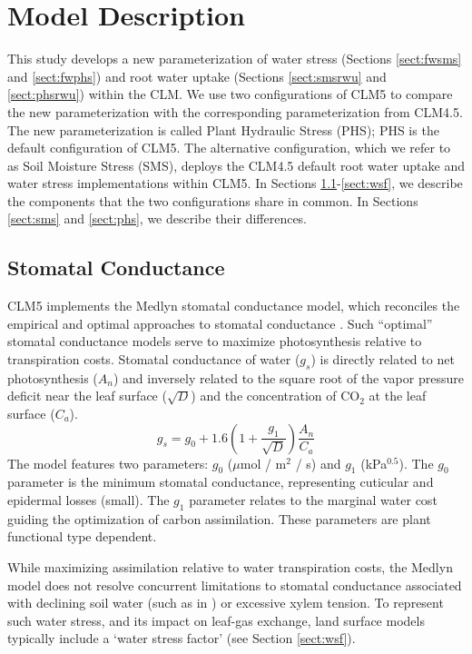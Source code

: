\documentclass[draft,linenumbers]{agujournal}
\begin{document}
\section{Model Description}
This study develops a new parameterization of water stress (Sections \ref{sect:fwsms} and \ref{sect:fwphs}) and root water uptake (Sections \ref{sect:smsrwu} and \ref{sect:phsrwu}) within the CLM. We use two configurations of CLM5 to compare the new parameterization with the corresponding parameterization from CLM4.5. The new parameterization is called Plant Hydraulic Stress (PHS); PHS is the default configuration of CLM5. The alternative configuration, which we refer to as Soil Moisture Stress (SMS), deploys the CLM4.5 default root water uptake and water stress implementations within CLM5.  In Sections \ref{sect:gs}-\ref{sect:wsf}, we describe the components that the two configurations share in common. In Sections \ref{sect:sms} and \ref{sect:phs}, we describe their differences.
    
    
\subsection{Stomatal Conductance}
\label{sect:gs}
    CLM5 implements the Medlyn stomatal conductance model, which reconciles the empirical and optimal approaches to 
    stomatal conductance \citep{medlyn2011}.
    Such ``optimal'' stomatal conductance models serve to maximize photosynthesis relative to transpiration costs. 
    Stomatal conductance of water ($g_s$) is directly related to net photosynthesis ($A_n$) 
    and inversely related to the square root of the vapor pressure deficit near the leaf surface ($\sqrt{D}$) and the concentration of CO$_2$ at the leaf surface ($C_a$).
    \begin{equation}
    g_s=g_0+1.6\left(1+\dfrac{g_1}{\sqrt{D}}\right)\dfrac{A_n}{C_a}
    \end{equation}
    The model features two parameters: $g_0$ ($\mu$mol / m$^2$ / s) and $g_1$ (kPa$^{0.5}$). 
    The $g_0$ parameter is the minimum stomatal conductance, representing cuticular and epidermal losses (small). 
    The $g_1$ parameter relates to the marginal water cost guiding the optimization of carbon assimilation. 
    These parameters are plant functional type dependent.
    
    While maximizing assimilation relative to water transpiration costs, the Medlyn model does not 
    resolve concurrent limitations to stomatal conductance associated with declining soil water (such as in \cite{manzoni2013b}) or excessive xylem tension. 
    To represent such water stress, and its impact on leaf-gas exchange, land surface models typically include a `water stress factor' (see Section \ref{sect:wsf}). 
\end{document}
